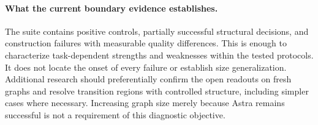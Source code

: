 \paragraph{What the current boundary evidence establishes.}
The suite contains positive controls, partially successful structural
decisions, and construction failures with measurable quality differences.
This is enough to characterize task-dependent strengths and weaknesses
within the tested protocols. It does not locate the onset of every failure
or establish size generalization. Additional research should preferentially
confirm the open readouts on fresh graphs and resolve transition regions
with controlled structure, including simpler cases where necessary.
Increasing graph size merely because Astra remains successful is not a
requirement of this diagnostic objective.
